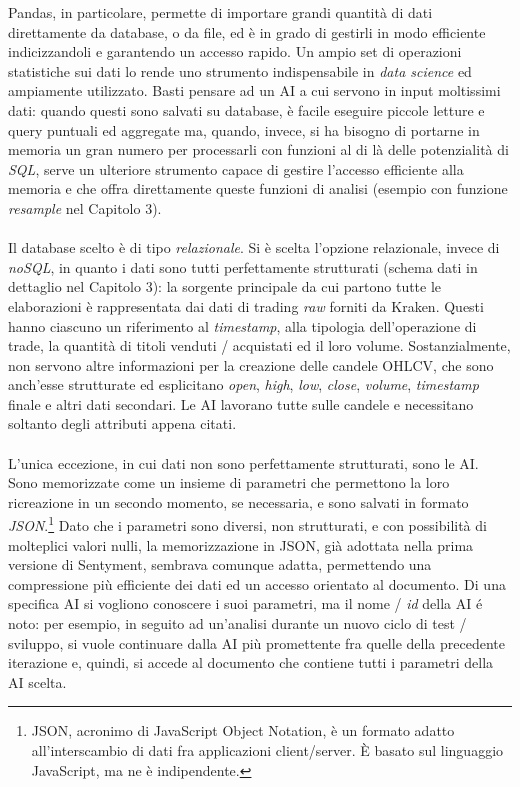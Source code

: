 \documentclass[a4paper,12pt]{report}
\begin{document}
Pandas, in particolare, permette di importare grandi quantità di dati direttamente da database, o da file, ed è in grado di gestirli in modo efficiente indicizzandoli e garantendo un accesso rapido. Un ampio set di operazioni statistiche sui dati lo rende uno strumento indispensabile in \textit{data science} ed ampiamente utilizzato. Basti pensare ad un AI a cui servono in input moltissimi dati: quando questi sono salvati su database, è facile eseguire piccole letture e query puntuali ed aggregate ma, quando, invece, si ha bisogno di portarne in memoria un gran numero per processarli con funzioni al di là delle potenzialità di \textit{SQL}, serve un ulteriore strumento capace di gestire l'accesso efficiente alla memoria e che offra direttamente queste funzioni di analisi (esempio con funzione \textit{resample} nel Capitolo 3).\\~\\ Il database scelto è di tipo \textit{relazionale}. Si è scelta l'opzione relazionale, invece di \textit{noSQL}, in quanto i dati sono tutti perfettamente strutturati (schema dati in dettaglio nel Capitolo 3): la sorgente principale da cui partono tutte le elaborazioni è rappresentata dai dati di trading \textit{raw} forniti da Kraken. Questi hanno ciascuno un riferimento al \textit{timestamp}, alla tipologia dell'operazione di trade, la quantità di titoli venduti / acquistati ed il loro volume. Sostanzialmente, non servono altre informazioni per la creazione delle candele OHLCV, che sono anch'esse strutturate ed esplicitano \textit{open}, \textit{high}, \textit{low}, \textit{close}, \textit{volume}, \textit{timestamp} finale e altri dati secondari. Le AI lavorano tutte sulle candele e necessitano soltanto degli attributi appena citati.\\~\\
L'unica eccezione, in cui dati non sono perfettamente strutturati, sono le AI. Sono memorizzate come un insieme di parametri che permettono la loro ricreazione in un secondo momento, se necessaria, e sono salvati in formato \textit{JSON}.\footnote{JSON, acronimo di JavaScript Object Notation, è un formato adatto all'interscambio di dati fra applicazioni client/server. È basato sul linguaggio JavaScript, ma ne è indipendente.} Dato che i parametri sono diversi, non strutturati, e con possibilità di molteplici valori nulli, la memorizzazione in JSON, già adottata nella prima versione di Sentyment, sembrava comunque adatta, permettendo una compressione più efficiente dei dati ed un accesso orientato al documento. Di una specifica AI si vogliono conoscere i suoi parametri, ma il nome / \textit{id} della AI é noto: per esempio, in seguito ad un'analisi durante un nuovo ciclo di test / sviluppo, si vuole continuare dalla AI più promettente fra quelle della precedente iterazione e, quindi, si accede al documento che contiene tutti i parametri della AI scelta.\\
\end{document}
